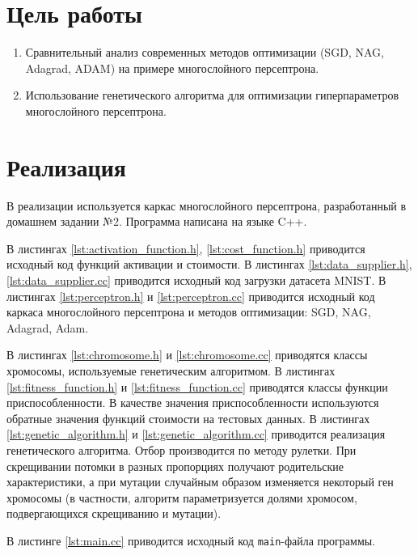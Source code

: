 \documentclass[a4paper, 14pt]{extarticle}
\begin{document}
\renewcommand{\ttdefault}{pcr}

\setlength{\tabcolsep}{3pt}
\newpage
\setcounter{page}{2}

\section{Цель работы}

\begin{enumerate}
  \item Сравнительный анализ современных методов оптимизации (SGD, NAG, Adagrad, ADAM) на примере многослойного персептрона.
  \item Использование генетического алгоритма для оптимизации гиперпараметров многослойного персептрона.
\end{enumerate}

\section{Реализация}

В реализации используется каркас многослойного персептрона, разработанный в домашнем задании №2. Программа написана на языке C++.

В листингах \ref{lst:activation_function.h}, \ref{lst:cost_function.h} приводится исходный код функций активации и стоимости.
В листингах \ref{lst:data_supplier.h}, \ref{lst:data_supplier.cc} приводится исходный код загрузки датасета MNIST.
В листингах \ref{lst:perceptron.h} и \ref{lst:perceptron.cc} приводится исходный код каркаса многослойного персептрона и 
методов оптимизации: SGD, NAG, Adagrad, Adam.

В листингах \ref{lst:chromosome.h} и \ref{lst:chromosome.cc} приводятся классы хромосомы, используемые генетическим алгоритмом.
В листингах \ref{lst:fitness_function.h} и \ref{lst:fitness_function.cc} приводятся классы функции приспособленности. В качестве
значения приспособленности используются обратные значения функций стоимости на тестовых данных.
В листингах \ref{lst:genetic_algorithm.h} и \ref{lst:genetic_algorithm.cc} приводится реализация генетического алгоритма. Отбор производится
по методу рулетки. При скрещивании потомки в разных пропорциях получают родительские характеристики, а при мутации случайным
образом изменяется некоторый ген хромосомы (в частности, алгоритм параметризуется долями хромосом, подвергающихся скрещиванию и мутации).

В листинге \ref{lst:main.cc} приводится исходный код \texttt{main}-файла программы.
\end{document}
